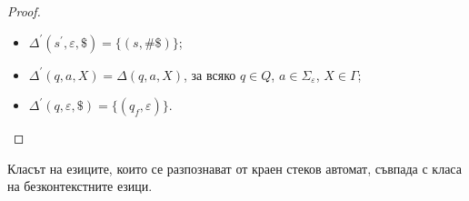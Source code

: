 \begin{proof}
\begin{enumerate}[1)]
    \begin{itemize}
    \item 
      $\Delta^\prime(s^\prime,\varepsilon,\$) = \{(s, \#\$)\}$;
    \item
      $\Delta^\prime(q,a,X) = \Delta(q,a,X)$, за всяко $q \in Q$, $a \in \Sigma_\varepsilon$, $X \in \Gamma$;
    \item
      $\Delta^\prime(q,\varepsilon,\$) = \{(q_f,\varepsilon)\}$.
    \end{itemize}
  \end{enumerate}
\end{proof}

\begin{thm}
  Класът на езиците, които се разпознават от краен стеков автомат, съвпада с
  класа на безконтекстните езици.
\end{thm}
